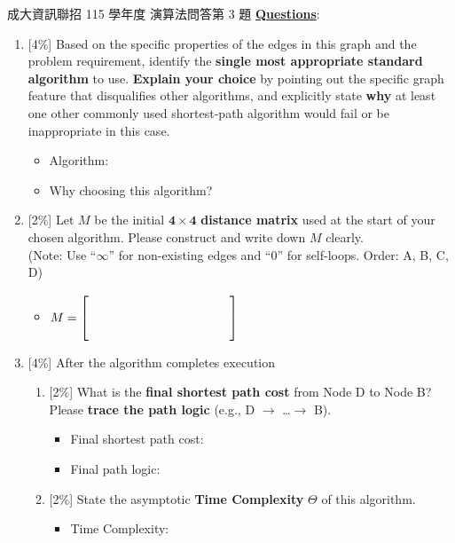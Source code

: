\begin{pastexam}[label={px:ncku-115-prog-16}]{成大資訊聯招 115 學年度 演算法問答第 3 題}
\underline{\textbf{Questions}}:
\begin{enumerate}[label=(\arabic*)]
\item {[4\%]} Based on the specific properties of the edges in this graph and the problem requirement,
identify the \textbf{single most appropriate standard algorithm} to use. \textbf{Explain your choice}
by pointing out the specific graph feature that disqualifies other algorithms, and explicitly state
\textbf{why} at least one other commonly used shortest-path algorithm would fail or be inappropriate in
this case.
\begin{itemize}
\item Algorithm: \underline{\hspace{6cm}}
\item Why choosing this algorithm? \underline{\hspace{4.5cm}}
\end{itemize}
\item {[2\%]} Let $M$ be the initial $\mathbf{4\times 4}$ \textbf{distance matrix} used at the start of
your chosen algorithm. Please construct and write down $M$ clearly.\\
(Note: Use ``$\infty$'' for non-existing edges and ``0'' for self-loops. Order: A, B, C, D)
\begin{itemize}\item $M = \left[\rule{0pt}{2.2em}\hspace{4cm}\right]$\end{itemize}
\item {[4\%]} After the algorithm completes execution
\begin{enumerate}[label=(\alph*)]
\item {[2\%]} What is the \textbf{final shortest path cost} from Node D to Node B? Please
\textbf{trace the path logic} (e.g., D $\to$ \dots $\to$ B).
\begin{itemize}
\item Final shortest path cost: \underline{\hspace{6cm}}
\item Final path logic: \underline{\hspace{6cm}}
\end{itemize}
\item {[2\%]} State the asymptotic \textbf{Time Complexity} $\Theta$ of this algorithm.
\begin{itemize}\item Time Complexity: \underline{\hspace{6cm}}\end{itemize}
\end{enumerate}
\end{enumerate}
\end{pastexam}

